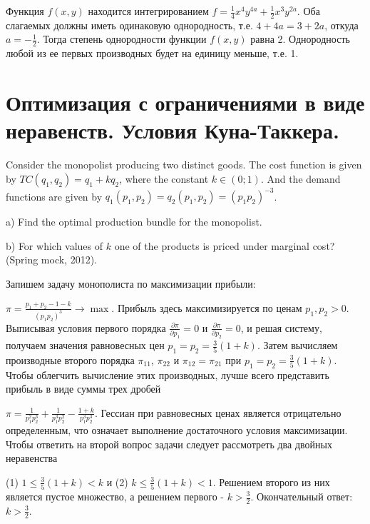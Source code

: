 \begin{solution}
Функция $f(x,y)$ находится интегрированием $f=\frac{1}{4} x^{4} y^{4a} +\frac{1}{2} x^{3} y^{2a} $. Оба слагаемых должны иметь одинаковую однородность, т.е. $4+4a=3+2a$, откуда $a=-\frac{1}{2} $. Тогда степень однородности функции $f(x,y)$ равна 2. Однородность любой из ее первых производных будет на единицу меньше, т.е. 1.
\end{solution}




\section{Оптимизация с ограничениями в виде неравенств. Условия Куна-Таккера.}

\begin{problem}
Consider the monopolist producing two distinct goods. The cost function is given by $TC(q_{1} ,q_{2} )=q_{1} +kq_{2} $, where the constant $k\in (0;1)$. And the demand functions are given by $q_{1} (p_{1} ,p_{2} )=q_{2} (p_{1} ,p_{2} )=(p_{1} p_{2} )^{-3} $. 

a) Find the optimal production bundle for the monopolist.

b) For which values of  $k$ one of the products is priced under marginal cost? (Spring mock, 2012).
\end{problem}


\begin{solution}
Запишем задачу монополиста по максимизации прибыли:

$\pi =\frac{p_{1} +p_{2} -1-k}{(p_{1} p_{2} )^{3} } \to \max $. Прибыль здесь максимизируется по ценам $p_{1} ,p_{2} >0$. Выписывая условия первого порядка $\frac{\partial \pi }{\partial p_{1} } =0$ и $\frac{\partial \pi }{\partial p_{2} } =0$, и решая систему, получаем значения равновесных цен $p_{1} =p_{2} =\frac{3}{5} (1+k)$. Затем вычисляем производные второго порядка $\pi _{11} $, $\pi _{22} $ и $\pi _{12} =\pi _{21} $ при $p_{1} =p_{2} =\frac{3}{5} (1+k)$. Чтобы облегчить вычисление этих производных, лучше всего представить прибыль в виде суммы трех дробей



$\pi =\frac{1}{p_{1}^{2} p_{2}^{3} } +\frac{1}{p_{1}^{3} p_{2}^{2} } -\frac{1+k}{p_{1}^{3} p_{2}^{3} } $. Гессиан при равновесных ценах является отрицательно определенным, что означает выполнение достаточного условия максимизации. Чтобы ответить на второй вопрос задачи следует рассмотреть два двойных неравенства

(1) $1\le \frac{3}{5} (1+k)<k$ и (2) $k\le \frac{3}{5} (1+k)<1$. Решением второго из них является пустое множество, а решением первого - $k>\frac{3}{2} $. Окончательный ответ: $k>\frac{3}{2} $.
\end{solution}


